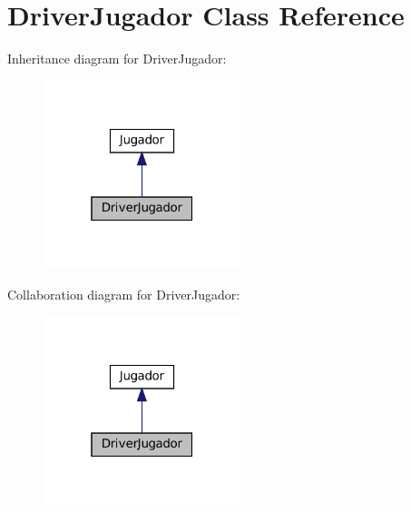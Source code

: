 \section{Driver\+Jugador Class Reference}
\label{class_dominio_1_1controladores_1_1_drivers_1_1_driver_jugador}


Inheritance diagram for Driver\+Jugador\+:
\nopagebreak
\begin{figure}[H]
\begin{center}
\leavevmode
\includegraphics[width=163pt]{class_dominio_1_1controladores_1_1_drivers_1_1_driver_jugador__inherit__graph}
\end{center}
\end{figure}


Collaboration diagram for Driver\+Jugador\+:
\nopagebreak
\begin{figure}[H]
\begin{center}
\leavevmode
\includegraphics[width=163pt]{class_dominio_1_1controladores_1_1_drivers_1_1_driver_jugador__coll__graph}
\end{center}
\end{figure}
